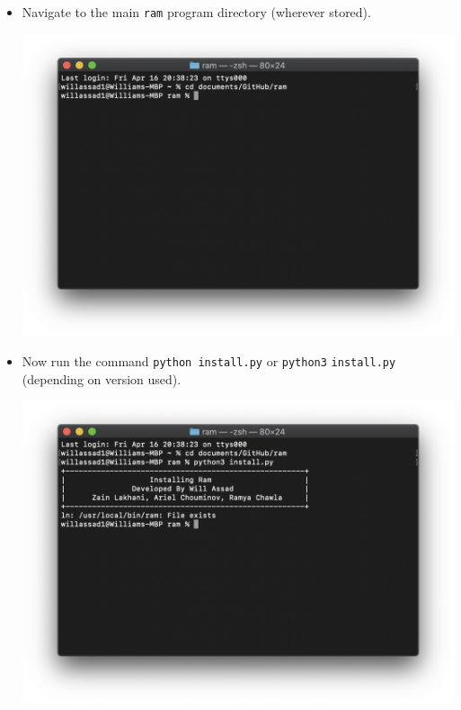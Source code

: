 \documentclass[11pt]{article}
\begin{document}
\begin{itemize}
        \newpage
            
        \item Navigate to the main \texttt{ram} program directory (wherever stored).
            
        \begin{center}
            \includegraphics[scale=0.45]{terminal2.png}
        \end{center}
            
        \item Now run the command \texttt{python install.py} or \texttt{python3} \newline \texttt{install.py} (depending on version used).
            
        \begin{center}
            \includegraphics[scale=0.45]{terminal3.png}
        \end{center}
            

\end{itemize}
\end{document}

